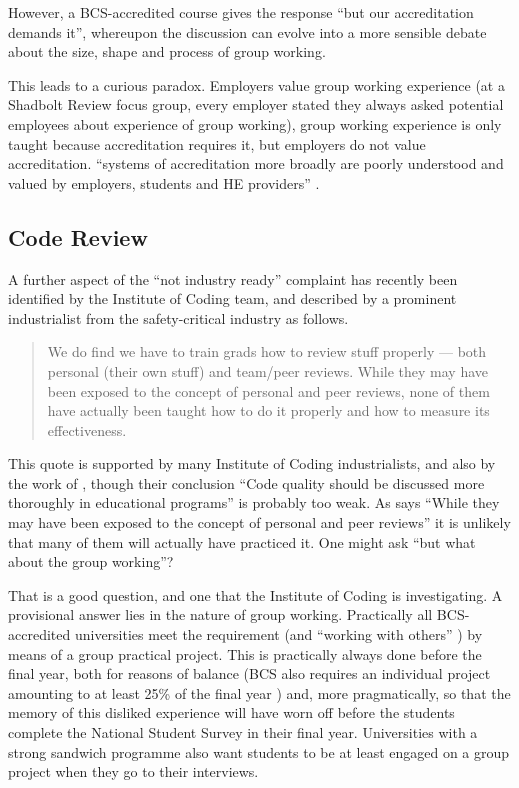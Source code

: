 \documentclass[sigconf,anonymous]{acmart}
\begin{document}
However, a BCS-accredited course gives the response ``but our accreditation demands it'', whereupon the discussion can evolve into a more sensible debate about the size, shape and process of group working.
\par
This leads to a curious paradox. Employers value group working experience (at a Shadbolt Review focus group, every employer stated they always asked potential employees about experience of group working), group working experience is only taught because accreditation requires it, but employers do not value accreditation.  ``systems of accreditation more broadly are poorly understood and valued by employers, students and HE providers'' \cite[\P2.12]{Shadbolt2016a}.

\subsection{Code Review}
A further aspect of the ``not industry ready'' complaint has recently been identified by the Institute of Coding team, and described by a prominent industrialist from the safety-critical industry as follows.
\begin{quote}
We do find we have to train grads how to review stuff properly --- both personal (their own stuff) and team/peer reviews. While they may have been exposed to the concept of personal and peer reviews, none of them have actually been taught how to do it properly and how to measure its effectiveness. \cite{Chapman2018c}
\end{quote}
This quote is supported by many Institute of Coding industrialists, and also by the work of  \cite{Boerstleretal2018a}, though their conclusion ``Code quality should be discussed more thoroughly in educational programs'' is probably too weak. As \cite{Chapman2018c} says ``While they may have been exposed to the concept of personal and peer reviews'' it is unlikely that many of them will actually have practiced it.  One might ask ``but what about the group working''? 
\par
That is a good question, and one that the Institute of Coding is investigating. A provisional answer lies in the nature of group working. Practically all BCS-accredited universities meet the requirement \cite[Requirement 2.3.1]{BCS2018a} (and ``working with others'' \cite[Requirement 2.3.2]{BCS2018a}) by means of a group practical project. This is practically always done before the final year, both for reasons of balance (BCS also requires an individual project amounting to at least 25\% of the final year \cite[Requirement 2.5.1]{BCS2018a}) and, more pragmatically, so that the memory of this disliked experience will have worn off before the students complete the National Student Survey in their final year. Universities with a strong sandwich programme also want students to be at least engaged on a group project when they go to their interviews.
\end{document}

